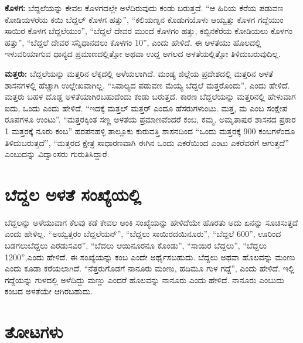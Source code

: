 \textbf{ಕೊಳಗ:} ಬೆದ್ದಲೆಯನ್ನು ಕೇವಲ ಕೊಳಗದಲ್ಲೇ ಅಳೆದಿರುವುದು ಕಂಡು ಬರುತ್ತದೆ. “ಆ ಹಿರಿಯ ಕೆರೆಯ ಪಡುವಣ ಕೋಡಿಯಳರೆಯ ಕಯಿ ಬೆದ್ದಲ್​ ಕೊಳಗ ಹತ್ತು”, “ಕಲಿಯಣ್ನನ ಕೊಡುಗೆಯೊಳು ಆಯ್ವತ್ತು ಕೊಳಗ ಗದ್ದೆಯುಂ ಸಾಯಿರ ಕೊಳಗ ಬೆದ್ದಲೆಯುಂ”, “ಬೆದ್ದಲೆ ದೇವರ ಮುಂದೆ ಕೊಳಗಂ ಹತ್ತು, ಕಬ್ಬಿನಕೆರೆಯ ಕೋಡಿಯಲು ಕೊಳಗಂ ಹತ್ತು”, “ಬೆದ್ದಲೆ ದೇವರ ಸನ್ನಿಧಾನದಲು ಕೊಳಗಂ 10”, ಎಂದು ಹೇಳಿದೆ. ಈ ಅಳತೆಯು ಹೊಲದಲ್ಲಿ ಇಳುವರಿಯಾಗುವ ಧಾನ್ಯದ ಪ್ರಮಾಣದಲ್ಲಿತ್ತೋ ಅಥವಾ ಉದ್ದ ಅಗಲದ ಅಳತೆಯಲ್ಲಿತ್ತೋ ತಿಳಿದುಬರುವುದಿಲ್ಲ.

\textbf{ಮತ್ತರು:} ಬೆದ್ದಲೆಯನ್ನು ಮತ್ತರಿನ ಲೆಕ್ಕದಲ್ಲಿ ಅಳೆಯಲಾಗಿದೆ. ಮಂಡ್ಯ ಜಿಲ್ಲೆಯ ಪ್ರದೇಶದಲ್ಲಿ ಮತ್ತರಿನ ಅಳತೆ ಶಾಸನಗಳಲ್ಲಿ ಹೆಚ್ಚಾಗಿ ಉಲ್ಲೇಖವಾಗಿಲ್ಲ. “ಸಿವಾಲ್ಯದ ಪಡುವಣ ಮೆಯ್ಯ ಬೆದ್ದಲೆ ಮತ್ತರೊಂದು”, ಎಂದು ಹೇಳಿದೆ. ಮತ್ತರು ಬಹಳ ದೊಡ್ಡ ಅಳತೆಯಾಗಿರಬಹುದೆಂದು ಕಂಡು ಬರುತ್ತದೆ. ಕಾರಣ ಬೆದ್ದಲೆಯನ್ನು ಮತ್ತರಿನಲ್ಲಿ ಹೇಳುವಾಗ ಐದು, ಒಂದು ಎಂದು ಹೇಳಿದೆ. “ಇದಕ್ಕೆ ಮತ್ತಲ್​ ಮತ್ತರ್​ ಎಂದೂ ಹೆಸರುಗಳುಂಟು. ಮತ್ತ, ಮ ಎಂಬ ಸಂಕ್ಷೇಪ ರೂಪಗಳೂ ಉಂಟು”. “ಮತ್ತರಕ್ಕಿಂತ ಸಣ್ಣ ಅಳತೆಯ ಪ್ರಮಾಣವೆಂದರೆ ಕಂಬ, ಕಮ್ಮ. ಅಮೃತಾಪುರ ಶಾಸನದ ಪ್ರಕಾರ 1 ಮತ್ತರಕ್ಕೆ ನೂರು ಕಂಬ” ಹರಪನಹಳ್ಳಿ ತಾಲ್ಲೂಕು ಕುರುವತ್ತಿ ಶಾಸನದಿಂದ “ಒಂದು ಮತ್ತರಕ್ಕೆ 900 ಕಂಬಗಳೆಂದೂ ತಿಳಿದುಬರುತ್ತದೆ”, “ಮತ್ತರದ ಕ್ಷೇತ್ರ ಸಾಧಾರಣವಾಗಿ ಈಗಿನ ಒಂದು ಎಕರೆಯಿಂದ ಎಂಟು ಎಕರೆವರೆಗೆ ಆಗುತ್ತದೆ” ಎಂಬುದನ್ನು ವಿದ್ವಾಂಸರು ಗುರುತಿಸಿದ್ದಾರೆ.


\section{ಬೆದ್ದಲ ಅಳತೆ ಸಂಖ್ಯೆಯಲ್ಲಿ}

ಬೆದ್ದಲನ್ನು ಅಳೆಯುವಾಗ ಕೆಲವು ಕಡೆ ಕೇವಲ ಅಂಕಿ ಸಂಖ್ಯೆಯನ್ನು ಹೇಳಿದೆಯೇ ಹೊರತು ಅದು ಏನನ್ನು ಸೂಚಿಸುತ್ತದೆ ಎಂದು ಹೇಳಿಲ್ಲ. “ಅಯ್ವತ್ತರಂ ಬೆದ್ದಲೆಯನ್​”, “ಬೆದ್ದಲು ಸಾಯಿರದಯಿನೂರು”, “ಬೆದ್ದಲೆ 600”, ಊರಿಂದ ಬಡಗಲುಬೆದ್ದಲು ಎರಡುಸವಿರ”, “ಬೆದಲು ಆಯಿನೂರನೂ ಕೊಂಡು”, “ಸಾಯಿರ ಬೆದ್ದಲು”, “ಬೆದ್ದಲು 1200”,ಎಂದು ಹೇಳಿದೆ. ಈ ಸಂಖ್ಯೆಯನ್ನು ಕಂಬ ಎಂದೇ ಅರ್ಥೈಸಬಹುದು. ಬೆದ್ದಲು ಅಥವಾ ಹೊಲವನ್ನು ಮಂಣು ಎಂದು ಕೂಡಾ ಕರೆಯಲಾಗಿದೆ. “ನೆತ್ತರುಗೊಡಗೆ ನಾನೂರು ಮಂಣು, ಹದಿಮೂ ಗುಳ ಗದ್ದೆ”, ಎಂದು ಹೇಳಿದೆ. ಇಲ್ಲಿ ಗದ್ದೆಯನ್ನು ಗುಳದಲ್ಲಿ ಅಳೆದಿದ್ದು ಮಣ್ಣು ಎಂದರೆ ಹೊಲವನ್ನು ನಾನೂರು ಎಂದು ಹೇಳಿದೆ. ನಾನೂರು ಎಂಬುದು ಕಂಬದ ಅಳತೆಯೇ ಆಗಿರಬಹುದು.


\section{ತೋಟಗಳು}

